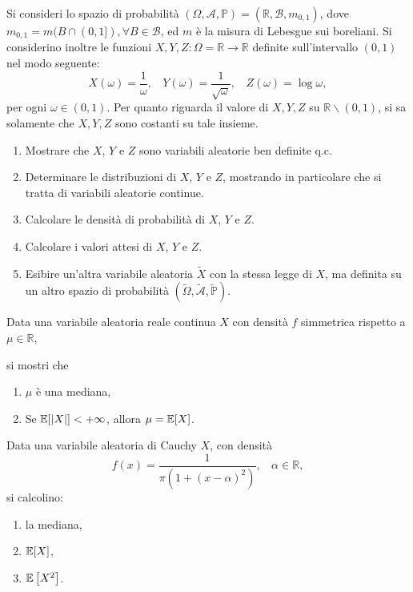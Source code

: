 

\ParteEsercizi
\Esercizio{}

Si consideri lo spazio di probabilità $( \Omega ,\mathcal{A} ,\mathbb{P}) =(\mathbb{R} ,\mathcal{B} ,m_{0,1})$, dove $m_{0,1} =m( B\cap ( 0,1]) ,\forall B\in \mathcal{B}$, ed $m$ è la misura di Lebesgue sui boreliani. Si considerino inoltre le funzioni $X,Y,Z:\Omega =\mathbb{R}\rightarrow \mathbb{R}$ definite sull'intervallo $( 0,1)$ nel modo seguente:
\begin{equation*}
X( \omega ) =\frac{1}{\omega } ,\ \ \ \ Y( \omega ) =\frac{1}{\sqrt{\omega }} ,\ \ \ \ Z( \omega ) =\log \omega ,
\end{equation*}
per ogni $\omega \in ( 0,1)$. Per quanto riguarda il valore di $X,Y,Z$ su $\mathbb{R} \smallsetminus ( 0,1)$, si sa solamente che $X,Y,Z$ sono costanti su tale insieme.
\begin{enumerate}
\item Mostrare che $X$, $Y$ e $Z$ sono variabili aleatorie ben definite q.c.
\item Determinare le distribuzioni di $X$, $Y$ e $Z$, mostrando in particolare che si tratta di variabili aleatorie continue.
\item Calcolare le densità di probabilità di $X$, $Y$ e $Z$.
\item Calcolare i valori attesi di $X$, $Y$ e $Z$.
\item Esibire un'altra variabile aleatoria $\tilde{X}$ con la stessa legge di $X$, ma definita su un altro spazio di probabilità $\left(\tilde{\Omega } ,\tilde{\mathcal{A}} ,\tilde{\mathbb{P}}\right)$.
\end{enumerate}
\Esercizio{}

Data una variabile aleatoria reale continua $X$ con densità $f$ simmetrica rispetto a $\mu \in \mathbb{R}$,

si mostri che
\begin{enumerate}
\item $\mu $ è una mediana,
\item Se $\mathbb{E}[| X| ] < +\infty $, allora $\mu =\mathbb{E}[ X]$.
\end{enumerate}

Data una variabile aleatoria di Cauchy $X$, con densità
\begin{equation*}
f( x) =\frac{1}{\pi \left( 1+( x-\alpha )^{2}\right)} ,\ \ \ \ \alpha \in \mathbb{R} ,
\end{equation*}
si calcolino:
\begin{enumerate}
\item la mediana,
\item $\mathbb{E}[ X]$,
\item $\mathbb{E}\left[ X^{2}\right]$.
\end{enumerate}
\Esercizio{$\star$}


